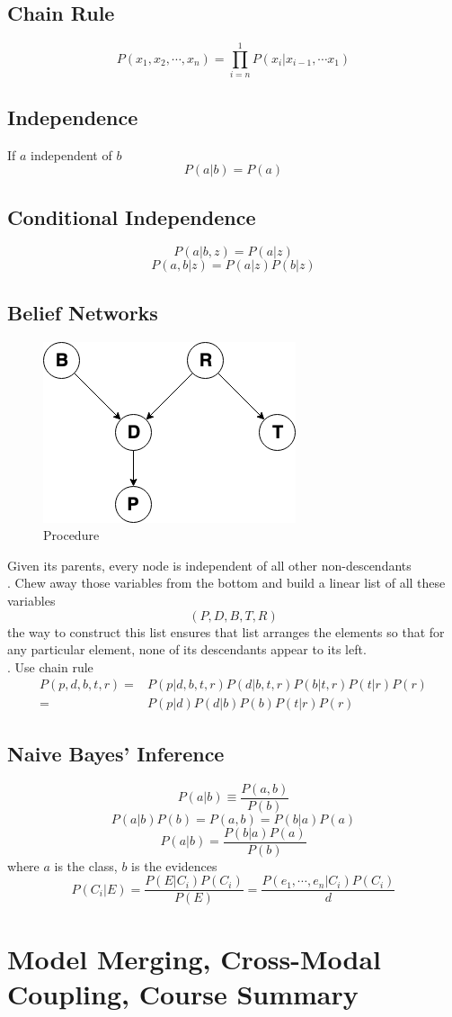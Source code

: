 \documentclass[12pt]{book}
\begin{document}
\subsection{Chain Rule}
$$\boxed{P(x_1,x_2,\cdots,x_n)=\prod_{i=n}^{1}P(x_i|x_{i-1},\cdots x_1)}$$
\subsection{Independence}
If $a$ independent of $b$
$$P(a|b)=P(a)$$
\newpage
\subsection{Conditional Independence}
$$P(a|b,z)=P(a|z)$$
$$P(a,b|z)=P(a|z)P(b|z)$$
\subsection{Belief Networks}
\begin{figure}[ht]
	\centering
	\includegraphics[scale=0.62]{Figure/Figure20_2.png}
	\caption{Procedure}
\end{figure}
Given its parents, every node is independent of all other non-descendants\\
. Chew away those variables from the bottom and build a linear list of all these variables
$$(P,D,B,T,R)$$
\indent the way to construct this list ensures that list arranges the elements so that for any particular element, none of its descendants appear to its left.\\
. Use chain rule
\begin{equation*}
\begin{aligned}
P(p,d,b,t,r)=&P(p|d,b,t,r)P(d|b,t,r)P(b|t,r)P(t|r)P(r)\\
=&P(p|d)P(d|b)P(b)P(t|r)P(r)
\end{aligned}
\end{equation*}
\subsection{Naive Bayes' Inference}
$$P(a|b)\equiv \frac{P(a,b)}{P(b)}$$
$$P(a|b)P(b)=P(a,b)=P(b|a)P(a)$$
$$P(a|b)=\frac{P(b|a)P(a)}{P(b)}$$
\indent where $a$ is the class, $b$ is the evidences
$$P(C_i|E)=\frac{P(E|C_i)P(C_i)}{P(E)}=\frac{P(e_1,\cdots,e_n|C_i)P(C_i)}{d}$$
\newpage

\newpage
\section{Model Merging, Cross-Modal Coupling, Course Summary}
\end{document}
